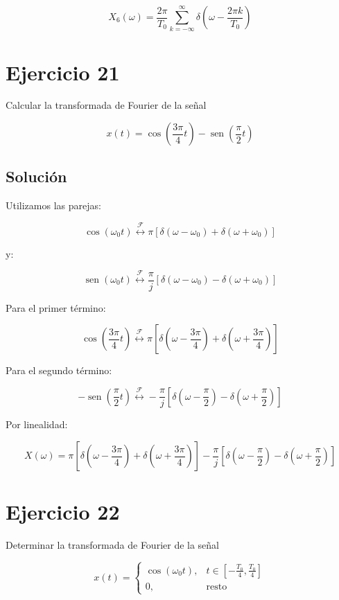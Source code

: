 \documentclass[fleqn]{article}
\DeclareMathOperator{\sen}{sen}
\begin{document}
	\[
	\boxed{
	X_6(\omega)
	=
	\frac{2\pi}{T_0}
	\sum_{k=-\infty}^{\infty}
	\delta
	\left(
	\omega-\frac{2\pi k}{T_0}
	\right)
	}
	\]

\section{Ejercicio 21}
	Calcular la transformada de Fourier de la señal

	\[
	x(t)=
	\cos\left(\frac{3\pi}{4}t\right)
	-
	\sen\left(\frac{\pi}{2}t\right)
	\]

	\subsection{Solución}

	Utilizamos las parejas:

	\[
	\cos(\omega_0 t)
	\overset{\mathcal{F}}{\longleftrightarrow}
	\pi
	\left[
	\delta(\omega-\omega_0)
	+
	\delta(\omega+\omega_0)
	\right]
	\]

	y:

	\[
	\sen(\omega_0 t)
	\overset{\mathcal{F}}{\longleftrightarrow}
	\frac{\pi}{j}
	\left[
	\delta(\omega-\omega_0)
	-
	\delta(\omega+\omega_0)
	\right]
	\]

	Para el primer término:

	\[
	\cos\left(\frac{3\pi}{4}t\right)
	\overset{\mathcal{F}}{\longleftrightarrow}
	\pi
	\left[
	\delta\left(\omega-\frac{3\pi}{4}\right)
	+
	\delta\left(\omega+\frac{3\pi}{4}\right)
	\right]
	\]

	Para el segundo término:

	\[
	-\sen\left(\frac{\pi}{2}t\right)
	\overset{\mathcal{F}}{\longleftrightarrow}
	-\frac{\pi}{j}
	\left[
	\delta\left(\omega-\frac{\pi}{2}\right)
	-
	\delta\left(\omega+\frac{\pi}{2}\right)
	\right]
	\]

	Por linealidad:

	\[
	\boxed{
	X(\omega)
	=
	\pi
	\left[
	\delta\left(\omega-\frac{3\pi}{4}\right)
	+
	\delta\left(\omega+\frac{3\pi}{4}\right)
	\right]
	-
	\frac{\pi}{j}
	\left[
	\delta\left(\omega-\frac{\pi}{2}\right)
	-
	\delta\left(\omega+\frac{\pi}{2}\right)
	\right]
	}
	\]

\section{Ejercicio 22}
	Determinar la transformada de Fourier de la señal

	\[
	x(t)=
	\begin{cases}
	\cos(\omega_0 t), & t\in\left[-\frac{T_0}{4},\frac{T_0}{4}\right] \\[2mm]
	0, & \text{resto}
	\end{cases}
	\]
\end{document}
